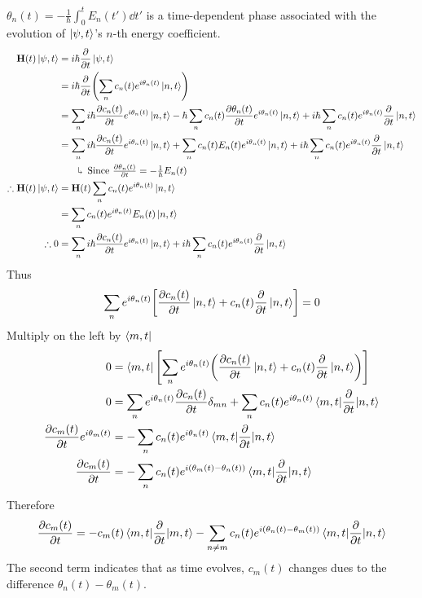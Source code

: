 \documentclass[12pt,a4paper,titlepage]{article}
\newcommand{\explain}[1]{%
	\quad\rotatebox[origin=c]{180}{\enskip$\Lsh$}\hfill
	\begin{minipage}[t]{\dimexpr\linewidth-8em\relax}
	#1
	\end{minipage}\hspace{4em}\bigskip
}
\begin{document}
$\theta_{n}(t)=-\frac{1}{\hbar}\int_{0}^{t}E_{n}(t')\dd{t'}$ is a time-dependent phase associated with the evolution of $\ket{\psi,t}$'s $n$-th energy coefficient.
\begin{equation}
\begin{aligned}
\vb{H}(t)\ket{\psi,t}&=i\hbar\pdv{t}\ket{\psi,t}\\
&=i\hbar\pdv{t}\qty(\sum_{n}c_{n}(t)e^{i\theta_{n}(t)}\ket{n,t})\\
&=\sum_{n}i\hbar\pdv{c_{n}(t)}{t}e^{i\theta_{n}(t)}\ket{n,t}-\hbar\sum_{n}c_{n}(t)\pdv{\theta_{n}(t)}{t}e^{i\theta_{n}(t)}\ket{n,t}+i\hbar\sum_{n}c_{n}(t)e^{i\theta_{n}(t)}\pdv{t}\ket{n,t}\\
&=\sum_{n}i\hbar\pdv{c_{n}(t)}{t}e^{i\theta_{n}(t)}\ket{n,t}+\sum_{n}c_{n}(t)E_{n}(t)e^{i\theta_{n}(t)}\ket{n,t}+i\hbar\sum_{n}c_{n}(t)e^{i\theta_{n}(t)}\pdv{t}\ket{n,t}\\
&\quad\explain{Since $\pdv{\theta_{n}(t)}{t}=-\frac{1}{\hbar}E_{n}(t)$}\\
\therefore\vb{H}(t)\ket{\psi,t}&=\vb{H}(t)\sum_{n}c_{n}(t)e^{i\theta_{n}(t)}\ket{n,t}\\
&=\sum_{n}c_{n}(t)e^{i\theta_{n}(t)}E_{n}(t)\ket{n,t}\\
\therefore 0&=\sum_{n}i\hbar\pdv{c_{n}(t)}{t}e^{i\theta_{n}(t)}\ket{n,t}+i\hbar\sum_{n}c_{n}(t)e^{i\theta_{n}(t)}\pdv{t}\ket{n,t}
\end{aligned}
\end{equation}
Thus
\begin{equation}
\sum_{n}e^{i\theta_{n}(t)}\qty[\pdv{c_{n}(t)}{t}\ket{n,t}+c_{n}(t)\pdv{t}\ket{n,t}]=0
\end{equation}
Multiply on the left by $\bra{m,t}$
\begin{equation}
\begin{aligned}
0&=\bra{m,t}\qty[\sum_{n}e^{i\theta_{n}(t)}\qty(\pdv{c_{n}(t)}{t}\ket{n,t}+c_{n}(t)\pdv{t}\ket{n,t})]\\
0&=\sum_{n}e^{i\theta_{n}(t)}\pdv{c_{n}(t)}{t}\delta_{mn}+\sum_{n}c_{n}(t)e^{i\theta_{n}(t)}\mel{m,t}{\pdv{t}}{n,t}\\
\pdv{c_{m}(t)}{t}e^{i\theta_{m}(t)}&=-\sum_{n}c_{n}(t)e^{i\theta_{n}(t)}\mel{m,t}{\pdv{t}}{n,t}\\
\pdv{c_{m}(t)}{t}&=-\sum_{n}c_{n}(t)e^{i(\theta_{m}(t)-\theta_{n}(t))}\mel{m,t}{\pdv{t}}{n,t}
\end{aligned}
\end{equation}
Therefore
\begin{equation}
\pdv{c_{m}(t)}{t}=-c_{m}(t)\mel{m,t}{\pdv{t}}{m,t}-\sum_{n\neq m}c_{n}(t)e^{i(\theta_{n}(t)-\theta_{m}(t))}\mel{m,t}{\pdv{t}}{n,t}
\end{equation}
The second term indicates that as time evolves, $c_{m}(t)$ changes dues to the difference $\theta_{n}(t)-\theta_{m}(t)$.\\
\end{document}
